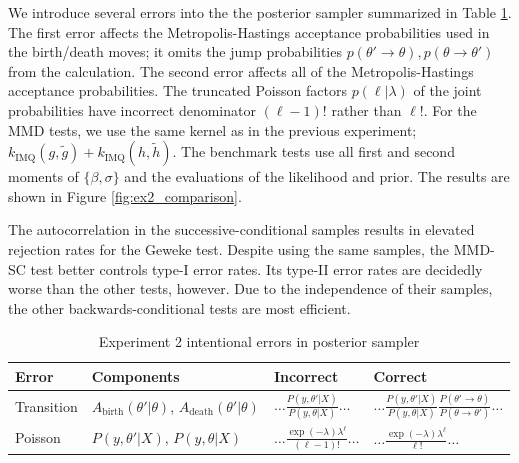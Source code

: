 \documentclass{article}
\begin{document}
We introduce several errors into the the posterior sampler summarized in Table \ref{tab:ex2_errors}. The first error affects the Metropolis-Hastings acceptance probabilities used in the birth/death moves; it omits the jump probabilities $p(\theta' \rightarrow \theta), p(\theta \rightarrow \theta')$ from the calculation. The second error affects all of the Metropolis-Hastings acceptance probabilities. The truncated Poisson factors $p(\ell|\lambda)$  of the joint probabilities have incorrect denominator $(\ell-1)!$ rather than $\ell!$. 
For the MMD tests, we use the same kernel as in the previous experiment;  $k_{\mathrm{IMQ}}(g, \tilde{g}) + k_{\mathrm{IMQ}}(h, \tilde{h})$. The benchmark tests use all first and second moments of $\{\beta,\sigma\}$ and the evaluations of the likelihood and prior.
The results are shown in Figure \ref{fig:ex2_comparison}.

The autocorrelation in the successive-conditional samples results in elevated rejection rates for the Geweke test. Despite using the same samples, the MMD-SC test better controls type-I error rates. Its type-II error rates are decidedly worse than the other tests, however. Due to the independence of their samples, the other backwards-conditional tests are most efficient.

\begin{table}
    \caption{Experiment 2 intentional errors in posterior sampler}
    \label{tab:ex2_errors}
    \centering
    \begin{tabular}{l|l|l|l}
    \toprule
          Error & Components & Incorrect & Correct \\
    \midrule  
         Transition & $A_{\text{birth}}(\theta'|\theta)$, $A_{\text{death}}(\theta'|\theta)$  &  $\ldots\frac{P(y, \theta' | X )}{P(y, \theta | X )}\ldots$ & $\ldots\frac{P(y, \theta' | X )}{P(y, \theta | X )} \frac{P(\theta' \rightarrow \theta)}{P(\theta \rightarrow \theta')}\ldots$\\
         Poisson & $P(y, \theta' | X )$, $P(y, \theta | X )$ & $\ldots \frac{\exp{(-\lambda)} \lambda^{\ell}}{(\ell-1)!} \ldots$ & $\ldots \frac{\exp{(-\lambda)} \lambda^{\ell}}{\ell!} \ldots$ \\
    \bottomrule
    \end{tabular}
\end{table}
\end{document}

